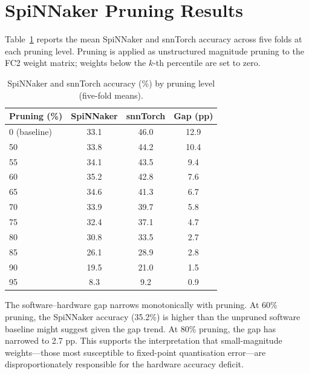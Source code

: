 \section{SpiNNaker Pruning Results}
\label{sec:app-spinnaker-pruning}

Table~\ref{tab:spinnaker-pruning} reports the mean SpiNNaker and snnTorch accuracy across five folds at each pruning level. Pruning is applied as unstructured magnitude pruning to the FC2 weight matrix; weights below the $k$-th percentile are set to zero.

\begin{table}[H]
\centering
\caption{SpiNNaker and snnTorch accuracy (\%) by pruning level (five-fold means).}
\label{tab:spinnaker-pruning}
\small
\begin{tabular}{lccc}
\toprule
\textbf{Pruning (\%)} & \textbf{SpiNNaker} & \textbf{snnTorch} & \textbf{Gap (pp)} \\
\midrule
0  (baseline)  & 33.1 & 46.0 & 12.9 \\
50             & 33.8 & 44.2 & 10.4 \\
55             & 34.1 & 43.5 &  9.4 \\
60             & 35.2 & 42.8 &  7.6 \\
65             & 34.6 & 41.3 &  6.7 \\
70             & 33.9 & 39.7 &  5.8 \\
75             & 32.4 & 37.1 &  4.7 \\
80             & 30.8 & 33.5 &  2.7 \\
85             & 26.1 & 28.9 &  2.8 \\
90             & 19.5 & 21.0 &  1.5 \\
95             &  8.3 &  9.2 &  0.9 \\
\bottomrule
\end{tabular}
\end{table}

The software--hardware gap narrows monotonically with pruning. At 60\% pruning, the SpiNNaker accuracy (35.2\%) is higher than the unpruned software baseline might suggest given the gap trend. At 80\% pruning, the gap has narrowed to 2.7 pp. This supports the interpretation that small-magnitude weights---those most susceptible to fixed-point quantisation error---are disproportionately responsible for the hardware accuracy deficit.

